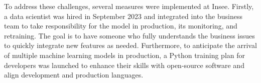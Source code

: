 To address these challenges, several measures were implemented at Insee. Firstly, a data scientist was hired in September 2023 and integrated into the business team to take responsibility for the model in production, its monitoring, and retraining. The goal is to have someone who fully understands the business issues to quickly integrate new features as needed. Furthermore, to anticipate the arrival of multiple machine learning models in production, a Python training plan for developers was launched to enhance their skills with open-source software and align development and production languages.
